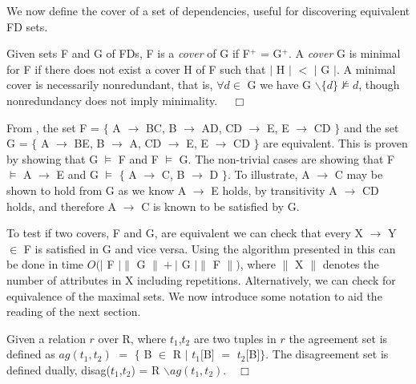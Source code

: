 We now define the cover of a set of dependencies, useful for
discovering equivalent FD sets.


\begin{definition}
\begin{rm}
Given sets F and G of FDs, F is a {\em cover} of G
if F$^+$ = G$^+$. A {\em cover} G is minimal for F if there does not
exist a cover H of F such that $\mid$ H $\mid$ $<$ $\mid$ G $\mid$. A
minimal cover is necessarily nonredundant,  
that is, $\forall d \in$ G we have  G $\backslash \{ d \} \not\models
d$, though nonredundancy does not imply minimality. $\quad\Box$
\end{rm}
\end{definition}

\begin{example}
\begin{rm}
From \cite{mr92}, the set F = $\{$ A $\to$ BC, B $\to$ AD, CD $\to$ E,
E $\to$ CD $\}$ and the set  G = $\{$ A $\to$ BE, B $\to$ A, CD $\to$
E, E $\to$ CD $\}$ are equivalent. This is proven by showing that G
$\models$ F and F $\models$ G.  The non-trivial 
cases are showing that F $\models$ A $\to$ E and G $\models$ $\{$ A
$\to$ C, B $\to$ D $\}$. To illustrate, A $\to$ C may be shown to hold
from G as we know A $\to$ E holds, by transitivity A $\to$ CD
holds, and therefore A $\to$ C is known to be satisfied by G. 
\end{rm}
\end{example}

To test if two covers, F and G, are equivalent we can check that
every X $\to$ Y $\in$ F is satisfied in G and vice versa.  Using the
algorithm presented in \cite{mr92} this can be done in time $O( \mid$ F
$\mid \|$ G $\| + \mid$ G $\mid \|$ F $\|)$, where $\|$ X $\|$ denotes
the number of attributes in X including repetitions. Alternatively, we
can check for 
equivalence of the maximal sets. We now introduce some notation to aid
the reading of the next section.
\begin{definition}
\begin{rm}
Given a relation $r$ over R, where $t_1$,$t_2$ are
two tuples in $r$ the agreement set is defined as
$ag(t_1, t_2)$ $=$ $\{$ B $\in$ R $\mid$ $t_1[$B$]$ $=$
$t_2[$B$]$$\}$. \newline 
The disagreement set is defined dually, disag($t_1$,$t_2$) = R
$\backslash ag(t_1, t_2) $.$\quad\Box$
\end{rm}
\end{definition}

